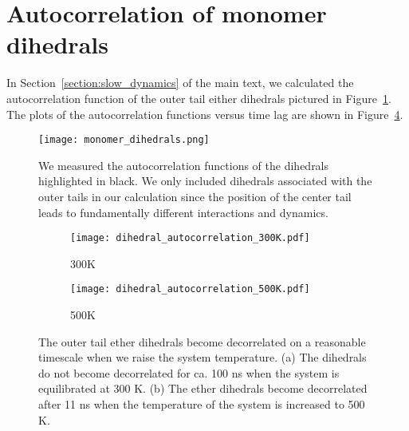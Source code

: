   \section{Autocorrelation of monomer dihedrals}
  
  In Section~\ref{section:slow_dynamics} of the main text, we calculated the
  autocorrelation function of the outer tail either dihedrals pictured
  in Figure~\ref{S-fig:dihedral_illustration}. The plots of the autocorrelation
  functions versus time lag are shown in Figure~\ref{S-fig:dihedral}.
  
  \begin{figure}[!htb]
  \centering
  \texttt{[image: monomer\_dihedrals.png]}
  \caption{We measured the autocorrelation functions of the dihedrals highlighted in
  black. We only included dihedrals associated with the outer tails in our calculation
  since the position of the center tail leads to fundamentally different interactions and
  dynamics.}\label{S-fig:dihedral_illustration}
  \end{figure}
  
  \begin{figure}[!htb]
  \centering
  \begin{subfigure}{0.45\textwidth}
  	\centering
  	\texttt{[image: dihedral\_autocorrelation\_300K.pdf]}
  	\caption{300K}\label{S-fig:dihedrals_300K}
  \end{subfigure}
  \begin{subfigure}{0.45\textwidth}
  	\centering
  	\texttt{[image: dihedral\_autocorrelation\_500K.pdf]} %
  	\caption{500K}\label{S-fig:dihedrals_500K}
  \end{subfigure}
  \caption{The outer tail ether dihedrals become decorrelated on a reasonable
  timescale when we raise the system temperature. (a) The dihedrals do not
  become decorrelated for ca. 100 ns when the system is equilibrated at 300 K.
  (b) The ether dihedrals become decorrelated after 11 ns when the temperature
  of the system is increased to 500 K.}\label{S-fig:dihedral}
  \end{figure}
  

